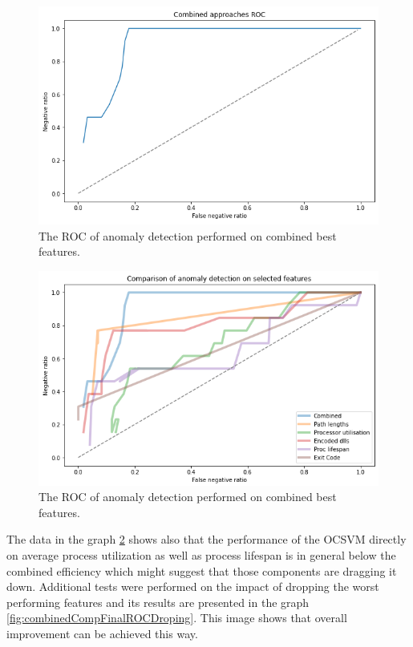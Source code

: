 \documentclass[a4paper,twoside,12pt]{book}
\begin{document}
\begin{figure}
	\centering
	\includegraphics[scale=0.9]{images/CombinedFinalROC}
	\caption{The ROC of anomaly detection performed on combined best features.}
	\label{fig:combinedFinalROC}
 \end{figure}


 \begin{figure}
	\centering
	\includegraphics[scale=0.9]{images/CombinedCompFinalROC}
	\caption{The ROC of anomaly detection performed on combined best features.}
	\label{fig:combinedCompFinalROC}
 \end{figure}

The data in the graph \ref{fig:combinedCompFinalROC} shows also that the performance of the OCSVM directly on average process utilization
as well as process lifespan is in general below the combined efficiency which might suggest that those components are dragging it down. 
Additional tests were performed on the impact of dropping the worst performing features and its results are presented in the
graph \ref{fig:combinedCompFinalROCDroping}. This image shows that overall improvement can be achieved this way.
\end{document}
